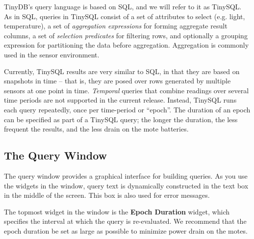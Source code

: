 \documentclass[11pt]{article}
\renewcommand{\baselinestretch}{1.2}
\begin{document}
TinyDB's query language is based on SQL, and we will refer
to it as TinySQL.  As in SQL, queries in
TinySQL consist of a set of
attributes to select (e.g. light, temperature), a set
of {\it aggregation expressions}
for forming aggregate result columns, a set of {\it
selection predicates} for filtering
rows, and optionally a grouping expression for
partitioning the data before aggregation.  Aggregation
is commonly used in the sensor environment.  

Currently, TinySQL results are very similar to SQL, in that they
are based on snapshots in time -- that is, they are
posed over rows generated by multiple sensors at one
point in time.  {\it Temporal} queries that combine
readings over several time periods are not supported in the current
release.  Instead, TinySQL runs each query repeatedly, once per
time-period or ``epoch''.  The duration of an epoch can be specified
as part of a TinySQL query; the longer the duration, the less
frequent the results, and the less drain on the mote batteries.


\subsection{The Query Window}
\label{sec:querywindow}
The query window provides a graphical interface for building queries.
As you use the widgets in the window, query text is dynamically
constructed in the text box in the middle of the screen.  This box is
also used for error messages.

\vspace{.1in}
\renewcommand{\baselinestretch}{1.0}\rm
{}
\renewcommand{\baselinestretch}{1.2}\rm
\vspace{.1in}

The topmost widget in the window is the {\bf Epoch
  Duration} widget,
which specifies the interval at which the query is re-evaluated.
We recommend that the epoch duration be set as large as possible to
minimize power drain on the motes.
\end{document}
